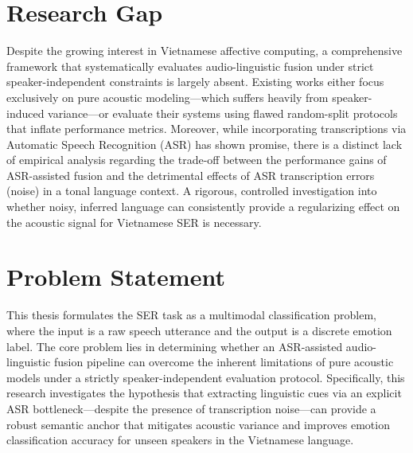 \documentclass[12pt,a4paper]{report}
\begin{document}
\section{Research Gap}
Despite the growing interest in Vietnamese affective computing, a comprehensive framework that systematically evaluates audio-linguistic fusion under strict speaker-independent constraints is largely absent. Existing works either focus exclusively on pure acoustic modeling—which suffers heavily from speaker-induced variance—or evaluate their systems using flawed random-split protocols that inflate performance metrics. Moreover, while incorporating transcriptions via Automatic Speech Recognition (ASR) has shown promise, there is a distinct lack of empirical analysis regarding the trade-off between the performance gains of ASR-assisted fusion and the detrimental effects of ASR transcription errors (noise) in a tonal language context. A rigorous, controlled investigation into whether noisy, inferred language can consistently provide a regularizing effect on the acoustic signal for Vietnamese SER is necessary.

\section{Problem Statement}
This thesis formulates the SER task as a multimodal classification problem, where the input is a raw speech utterance and the output is a discrete emotion label. The core problem lies in determining whether an ASR-assisted audio-linguistic fusion pipeline can overcome the inherent limitations of pure acoustic models under a strictly speaker-independent evaluation protocol. Specifically, this research investigates the hypothesis that extracting linguistic cues via an explicit ASR bottleneck—despite the presence of transcription noise—can provide a robust semantic anchor that mitigates acoustic variance and improves emotion classification accuracy for unseen speakers in the Vietnamese language.
\end{document}
